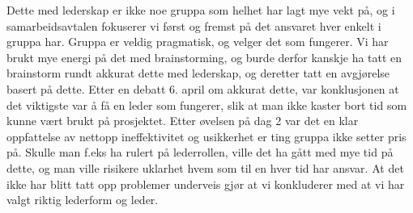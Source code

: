 Dette med lederskap er ikke noe gruppa som helhet har lagt mye vekt på, og i
samarbeidsavtalen fokuserer vi først og fremst på det ansvaret hver enkelt i
gruppa har.  Gruppa er veldig pragmatisk, og velger det som fungerer. Vi har
brukt mye energi på det med brainstorming, og burde derfor kanskje ha tatt en
brainstorm rundt akkurat dette med lederskap, og deretter tatt en avgjørelse
basert på dette.  Etter en debatt 6. april om akkurat dette, var konklusjonen
at det viktigste var å få en leder som fungerer, slik at man ikke kaster bort
tid som kunne vært brukt på prosjektet. Etter øvelsen på dag 2 var det en klar
oppfattelse av nettopp ineffektivitet og usikkerhet er ting gruppa ikke setter
pris på. Skulle man f.eks ha rulert på lederrollen, ville det ha gått med mye
tid på dette, og man ville risikere uklarhet hvem som til en hver tid har
ansvar. At det ikke har blitt tatt opp problemer underveis gjør at vi
konkluderer med at vi har valgt riktig lederform og leder. 
